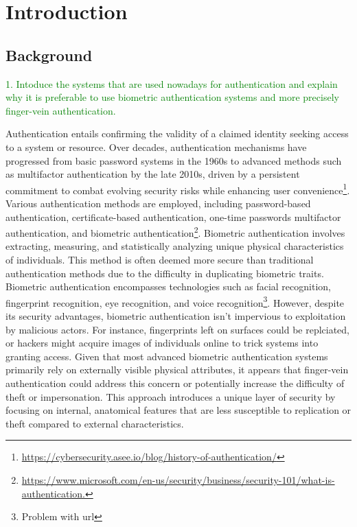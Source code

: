 \section{Introduction}

\subsection{Background}
\textcolor{green}
{1. Intoduce the systems that are used nowadays for authentication and explain why it is preferable to use biometric authentication systems and more precisely finger-vein authentication.}

Authentication entails confirming the validity of a claimed identity seeking access to a system or resource. 
Over decades, authentication mechanisms have progressed from basic password systems in the 1960s to advanced methods such as 
multifactor authentication by the late 2010s, driven by a persistent commitment to combat evolving security risks 
while enhancing user convenience\footnote{\url{https://cybersecurity.asee.io/blog/history-of-authentication/}}.
Various authentication methods are employed, including password-based authentication, certificate-based authentication, 
one-time passwords multifactor authentication, and biometric authentication\footnote{\url{https://www.microsoft.com/en-us/security/business/security-101/what-is-authentication.}}.
Biometric authentication involves extracting, measuring, and statistically analyzing unique physical characteristics of individuals.
This method is often deemed more secure than traditional authentication methods due to the difficulty in duplicating biometric traits.
Biometric authentication encompasses technologies such as facial recognition, fingerprint recognition, eye recognition,
and voice recognition\footnote{Problem with url}. %
However, despite its security advantages, biometric authentication isn't impervious to exploitation by malicious actors.
For instance, fingerprints left on surfaces could be replciated, or hackers might acquire images of individuals 
online to trick systems into granting access.
\newline Given that most advanced biometric authentication systems primarily rely on externally visible physical attributes, 
it appears that finger-vein authentication could address this concern or potentially increase the difficulty of theft or impersonation.
This approach introduces a unique layer of security by focusing on internal, anatomical features that are less susceptible 
to replication or theft compared to external characteristics.



